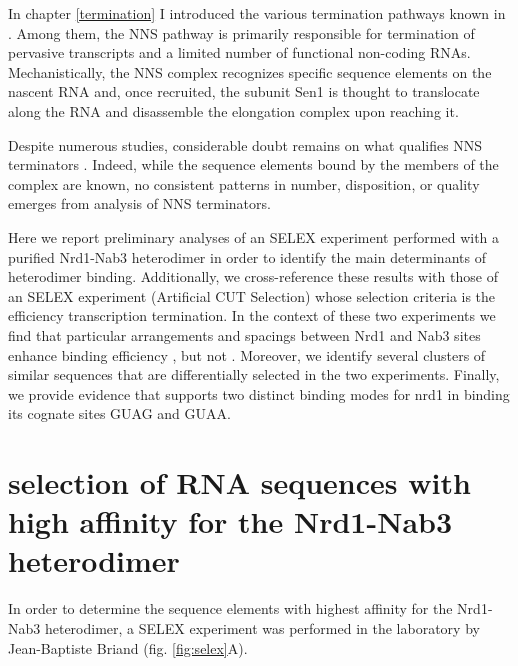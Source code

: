
In chapter \ref{termination} I introduced the various termination pathways known in \cer{}. Among them, the NNS pathway is primarily responsible for termination of pervasive transcripts and a limited number of functional non-coding RNAs. Mechanistically, the NNS complex recognizes specific sequence elements on the nascent RNA and, once recruited, the subunit Sen1 is thought to translocate along the RNA and disassemble the elongation complex upon reaching it. 

Despite numerous studies, considerable doubt remains on what qualifies NNS terminators \invivo{}. Indeed, while the sequence elements bound by the members of the complex are known, no consistent patterns in number, disposition, or quality emerges from analysis of \invivo{} NNS terminators. 

Here we report preliminary analyses of an \invitro{} SELEX experiment performed with a purified Nrd1-Nab3 heterodimer in order to identify the main determinants of heterodimer binding. Additionally, we cross-reference these results with those of an \invivo{} SELEX experiment (Artificial CUT Selection) whose selection criteria is the efficiency transcription termination. In the context of these two experiments we find that particular arrangements and spacings between Nrd1 and Nab3 sites enhance binding efficiency \invitro{}, but not \invivo{}. Moreover, we identify several clusters of similar sequences that are differentially selected in the two experiments. Finally, we provide evidence that supports two distinct binding modes for nrd1 in binding its cognate sites GUAG and GUAA.



\singlespacing
\section{\Invitro{} selection of RNA sequences with high affinity for the Nrd1-Nab3 heterodimer}
\doublespacing

In order to determine the sequence elements with highest affinity for the Nrd1-Nab3 heterodimer, a SELEX experiment was performed in the laboratory by Jean-Baptiste Briand (fig. \ref{fig:selex}A). 

